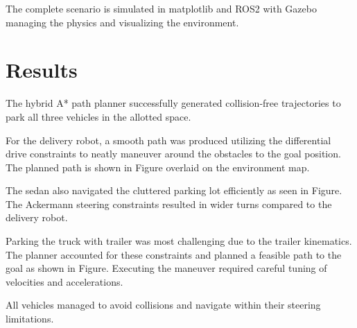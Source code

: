 \documentclass[12pt,a4paper]{article}
\begin{document}
The complete scenario is simulated in matplotlib and ROS2 with Gazebo managing the physics and visualizing the environment.


\pagebreak
\section{Results}\label{sec:result}
The hybrid A* path planner successfully generated collision-free trajectories to park all three vehicles in the allotted space.

For the delivery robot, a smooth path was produced utilizing the differential drive constraints to neatly maneuver around the obstacles to the goal position. The planned path is shown in Figure overlaid on the environment map.

The sedan also navigated the cluttered parking lot efficiently as seen in Figure. The Ackermann steering constraints resulted in wider turns compared to the delivery robot.

Parking the truck with trailer was most challenging due to the trailer kinematics. The planner accounted for these constraints and planned a feasible path to the goal as shown in Figure. Executing the maneuver required careful tuning of velocities and accelerations.

All vehicles managed to avoid collisions and navigate within their steering limitations. 
\end{document}
